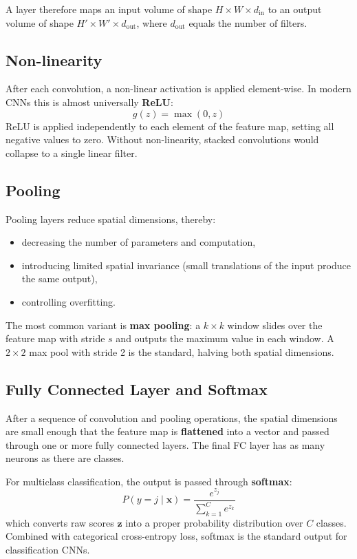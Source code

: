 \documentclass[11pt,a4paper]{article}
\theoremstyle{definition}
\theoremstyle{plain}
\theoremstyle{remark}
\begin{document}
A layer therefore maps an input volume of shape $H \times W \times d_{\text{in}}$ to an output volume of shape $H' \times W' \times d_{\text{out}}$, where $d_{\text{out}}$ equals the number of filters.

\subsection{Non-linearity}

After each convolution, a non-linear activation is applied element-wise. In modern CNNs this is almost universally \textbf{ReLU}:
\[
    g(z) = \max(0, z)
\]
ReLU is applied independently to each element of the feature map, setting all negative values to zero. Without non-linearity, stacked convolutions would collapse to a single linear filter.

\subsection{Pooling}

Pooling layers reduce spatial dimensions, thereby:
\begin{itemize}
    \item decreasing the number of parameters and computation,
    \item introducing limited spatial invariance (small translations of the input produce the same output),
    \item controlling overfitting.
\end{itemize}

The most common variant is \textbf{max pooling}: a $k \times k$ window slides over the feature map with stride $s$ and outputs the maximum value in each window. A $2 \times 2$ max pool with stride 2 is the standard, halving both spatial dimensions.

\subsection{Fully Connected Layer and Softmax}

After a sequence of convolution and pooling operations, the spatial dimensions are small enough that the feature map is \textbf{flattened} into a vector and passed through one or more fully connected layers. The final FC layer has as many neurons as there are classes.

For multiclass classification, the output is passed through \textbf{softmax}:
\[
    P(y = j \mid \mathbf{x}) = \frac{e^{z_j}}{\displaystyle\sum_{k=1}^{C} e^{z_k}}
\]
which converts raw scores $\mathbf{z}$ into a proper probability distribution over $C$ classes. Combined with categorical cross-entropy loss, softmax is the standard output for classification CNNs.
\end{document}
